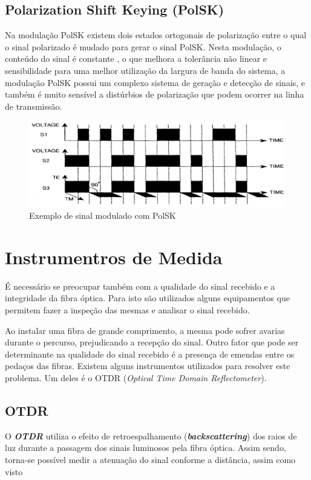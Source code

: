 \documentclass[article]{IEEEtran}
\begin{document}
\subsection{Polarization Shift Keying (PolSK)}
Na modulação PolSK existem dois estados ortogonais de polarização entre o qual o sinal polarizado é mudado para gerar o sinal PolSK. Nesta modulação, o conteúdo do sinal é constante , o que melhora a tolerância não linear e sensibilidade para uma melhor utilização da largura de banda do sistema, a modulação PolSK possui um complexo sistema de geração e detecção de sinais, e também é muito sensível a distúrbios de polarização que podem ocorrer na linha de transmissão.\cite{MODULATION}
\begin{figure}[h]
\includegraphics[width=\columnwidth]{polsk.png}
\caption{Exemplo de sinal modulado com PolSK}
\end{figure}

\section{Instrumentros de Medida}
É necessário se preocupar também com a qualidade do sinal recebido e a integridade da fibra óptica. Para isto são utilizados alguns equipamentos que permitem fazer a inspeção das mesmas e analisar o sinal recebido.

Ao instalar uma fibra de grande comprimento, a mesma pode sofrer avarias durante o percurso, prejudicando a recepção do sinal. Outro fator que pode ser determinante na qualidade do sinal recebido é a presença de emendas entre os pedaços das fibras. Existem alguns instrumentos utilizados para resolver este problema. Um deles é o OTDR (\textit{Optical Time Domain Reflectometer}).


\subsection{OTDR}
O \textbf{\textit{OTDR}}  utiliza o efeito de retroespalhamento (\textbf{\textit{backscattering}}) dos raios de luz durante a passagem dos sinais luminosos pela fibra óptica. Assim sendo, torna-se possível medir a atenuação do sinal conforme a distância, assim como visto \cite{FOA}
\end{document}
